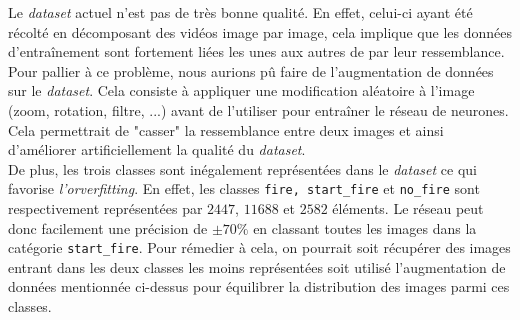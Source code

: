 \documentclass[10pt,a4paper]{article}
\begin{document}
   		Le \textit{dataset} actuel n'est pas de très bonne qualité. En effet, celui-ci ayant été récolté en décomposant des vidéos image par image, cela implique que les données d'entraînement sont fortement liées les unes aux autres de par leur ressemblance. Pour pallier à ce problème, nous aurions pû faire de l'augmentation de données sur le \textit{dataset}. Cela consiste à appliquer une modification aléatoire à l'image (zoom, rotation, filtre, ...) avant de l'utiliser pour entraîner le réseau de neurones. Cela permettrait de "casser" la ressemblance entre deux images et ainsi d'améliorer artificiellement la qualité du \textit{dataset}.\\
   		
   		De plus, les trois classes sont inégalement représentées dans le \textit{dataset} ce qui favorise \textit{l'orverfitting}. En effet, les classes \texttt{fire, start\_fire} et \texttt{no\_fire} sont respectivement représentées par $2447$, $11688$ et $2582$ éléments. Le réseau peut donc facilement une précision de $\pm70\%$ en classant toutes les images dans la catégorie \texttt{start\_fire}. Pour rémedier à cela, on pourrait soit récupérer des images entrant dans les deux classes les moins représentées soit utilisé l'augmentation de données mentionnée ci-dessus pour équilibrer la distribution des images parmi ces classes.
   	
   	\newpage
          	
\end{document}
